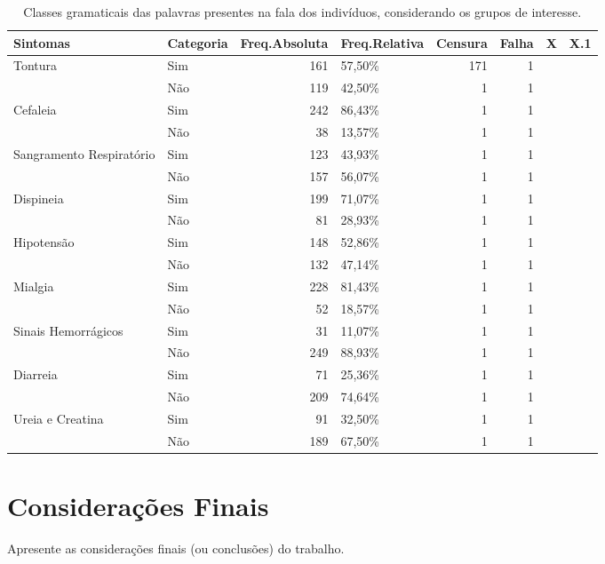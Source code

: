 \documentclass[
	12pt,				%
	openright,			%
	oneside,			%
	a4paper,			%
	brazil				%
	]{abntex2}
\begin{document}
\begin{table}[ht]
\centering
\caption{Classes gramaticais das palavras presentes na fala dos indivíduos, considerando os grupos de interesse.} 
\label{tab:classeg}
\begin{tabular}{llrlrrll}
  \hline
Sintomas & Categoria & Freq.Absoluta & Freq.Relativa & Censura & Falha & X & X.1 \\ 
  \hline
Tontura & Sim & 161 & 57,50\% & 171 &   1 &  &  \\ 
   & Não & 119 & 42,50\% &   1 &   1 &  &  \\ 
  Cefaleia & Sim & 242 & 86,43\% &   1 &   1 &  &  \\ 
   & Não &  38 & 13,57\% &   1 &   1 &  &  \\ 
  Sangramento Respiratório & Sim & 123 & 43,93\% &   1 &   1 &  &  \\ 
   & Não & 157 & 56,07\% &   1 &   1 &  &  \\ 
  Dispineia & Sim & 199 & 71,07\% &   1 &   1 &  &  \\ 
   & Não &  81 & 28,93\% &   1 &   1 &  &  \\ 
  Hipotensão & Sim & 148 & 52,86\% &   1 &   1 &  &  \\ 
   & Não & 132 & 47,14\% &   1 &   1 &  &  \\ 
  Mialgia & Sim & 228 & 81,43\% &   1 &   1 &  &  \\ 
   & Não &  52 & 18,57\% &   1 &   1 &  &  \\ 
  Sinais Hemorrágicos & Sim &  31 & 11,07\% &   1 &   1 &  &  \\ 
   & Não & 249 & 88,93\% &   1 &   1 &  &  \\ 
  Diarreia & Sim &  71 & 25,36\% &   1 &   1 &  &  \\ 
   & Não & 209 & 74,64\% &   1 &   1 &  &  \\ 
  Ureia e Creatina & Sim &  91 & 32,50\% &   1 &   1 &  &  \\ 
   & Não & 189 & 67,50\% &   1 &   1 &  &  \\ 
   \hline
\end{tabular}
\end{table}

\hypertarget{considerauxe7uxf5es-finais}{%
\chapter{Considerações Finais}\label{considerauxe7uxf5es-finais}}

\bigskip

Apresente as considerações finais (ou conclusões) do trabalho.

\setlength{\afterchapskip}{\baselineskip}


\postextual


% 

\end{document}
